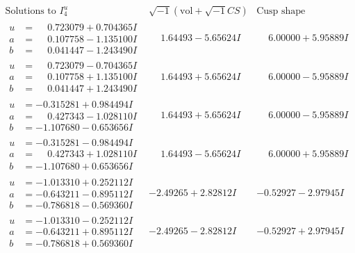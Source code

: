 \documentclass[1p]{elsarticle_modified}
\theoremstyle{definition}
\newcommand{\I}{\sqrt{-1}}
\begin{document}
$$\begin{array}{c|c|c}  
\text{Solutions to }I^u_{4}& \I (\text{vol} + \sqrt{-1}CS) & \text{Cusp shape}\\
 \hline 
\begin{aligned}
u &= \phantom{-}0.723079 + 0.704365 I \\
a &= \phantom{-}0.107758 - 1.135100 I \\
b &= \phantom{-}0.041447 - 1.243490 I\end{aligned}
 & \phantom{-}1.64493 - 5.65624 I & \phantom{-}6.00000 + 5.95889 I \\ \hline\begin{aligned}
u &= \phantom{-}0.723079 - 0.704365 I \\
a &= \phantom{-}0.107758 + 1.135100 I \\
b &= \phantom{-}0.041447 + 1.243490 I\end{aligned}
 & \phantom{-}1.64493 + 5.65624 I & \phantom{-}6.00000 - 5.95889 I \\ \hline\begin{aligned}
u &= -0.315281 + 0.984494 I \\
a &= \phantom{-}0.427343 - 1.028110 I \\
b &= -1.107680 - 0.653656 I\end{aligned}
 & \phantom{-}1.64493 + 5.65624 I & \phantom{-}6.00000 - 5.95889 I \\ \hline\begin{aligned}
u &= -0.315281 - 0.984494 I \\
a &= \phantom{-}0.427343 + 1.028110 I \\
b &= -1.107680 + 0.653656 I\end{aligned}
 & \phantom{-}1.64493 - 5.65624 I & \phantom{-}6.00000 + 5.95889 I \\ \hline\begin{aligned}
u &= -1.013310 + 0.252112 I \\
a &= -0.643211 - 0.895112 I \\
b &= -0.786818 - 0.569360 I\end{aligned}
 & -2.49265 + 2.82812 I & -0.52927 - 2.97945 I \\ \hline\begin{aligned}
u &= -1.013310 - 0.252112 I \\
a &= -0.643211 + 0.895112 I \\
b &= -0.786818 + 0.569360 I\end{aligned}
 & -2.49265 - 2.82812 I & -0.52927 + 2.97945 I \\ \hline\begin{aligned}

\end{aligned}
\end{array}$$
\end{document}
